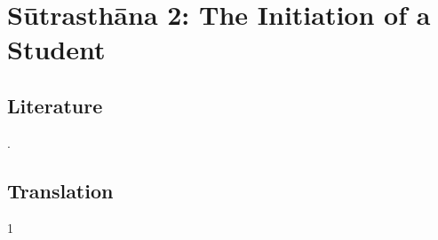 
\chapter{Sūtrasthāna 2: The Initiation of a Student}


\section{Literature}

\cites[IA, 204]{meul-hist}{prei-2007}[82--83]{wujad-2012}. 

\section{Translation}

\begin{translation}    
    \item [1] 
    
\end{translation}



